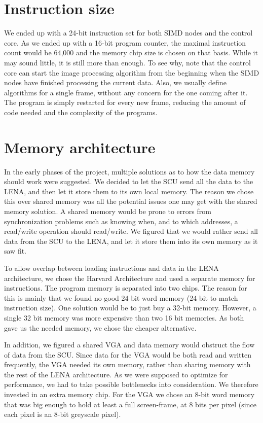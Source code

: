 \section{Instruction size}
We ended up with a 24-bit instruction set for both \ac{SIMD} nodes and the
control core. As we ended up with a 16-bit program counter, the maximal
instruction count would be 64,000 and the memory chip size is chosen on that
basis. While it may sound little, it is still more than enough. To see why, note
that the control core can start the image processing algorithm from the
beginning when the \ac{SIMD} nodes have finished processing the current data.
Also, we usually define algorithms for a single frame, without any concern for
the one coming after it. The program is simply restarted for every new frame,
reducing the amount of code needed and the complexity of the programs.

\section {Memory architecture}
 

In the early phases of the project, multiple solutions as to how the data memory
should work were suggested. We decided to let the \ac{SCU} send all the data to
the \ac{LENA}, and then let it store them to its own local memory. The reason we
chose this over shared memory was all the potential issues one may get with the
shared memory solution. A shared memory would be prone to errors from
synchronization problems such as knowing when, and to which addresses, a
read/write operation should read/write. We figured that we would rather send all
data from the \ac{SCU} to the \ac{LENA}, and let it store them into its own
memory as it saw fit.

To allow overlap between loading instructions and data in the LENA architecture,
we chose the Harvard Architecture and used a separate memory for
instructions. The program memory is separated into two chips. The reason for
this is mainly that we found no good 24 bit word memory (24 bit to match instruction
size). One solution would be to just buy a 32-bit memory. However, a single 32 bit
memory was more expensive than two 16 bit memories. As both gave us the needed
memory, we chose the cheaper alternative.

In addition, we figured a shared \ac{VGA} and data memory would obstruct the
flow of data from the \ac{SCU}. Since data for the \ac{VGA} would be both read
and written frequently, the \ac{VGA} needed its own memory, rather than sharing
memory with the rest of the LENA architecture. As we were supposed to optimize
for performance, we had to take possible bottlenecks into consideration. We
therefore invested in an extra memory chip. For the VGA we chose an 8-bit word
memory that was big enough to hold at least a full screen-frame, at 8 bits per
pixel (since each pixel is an 8-bit greyscale pixel).

